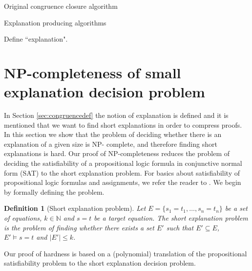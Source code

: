 \documentclass{easychair}
\newtheorem{definition}{Definition}
\begin{document}
Original congruence closure algorithm~\cite{}

Explanation producing algorithms~\cite{}

Define ``explanation".



\section*{NP-completeness of small explanation decision problem}
\label{sec:npcomplete}

In Section \ref{sec:congruencedef} the notion of explanation is
defined and it is mentioned that we want to find short explanations
in order to compress proofs. In this section we show that the problem
of deciding whether there is an explanation of a given size is NP-
complete, and therefore finding short explanations is hard. Our proof
of NP-completeness reduces the problem of deciding the satisfiability
of a propositional logic formula in conjunctive normal form (SAT) to
the short explanation problem. For basics about satisfiability of
propositional logic formulas and assignments, we refer the reader to
\cite{Biere3}. We begin by formally defining the problem.


\begin{definition}[Short explanation problem]
Let $E = \{ s_1 = t_1,\ldots, s_n = t_n\}$ be a set of equations, 
$k \in \mathbb{N}$ and $s = t$ be a target equation.  
The \emph{short explanation problem} is the problem of finding 
whether there exists a set $E'$ such that $E' \subseteq E$, 
$E' \models s = t$ and $|E'| \leq k$.
\end{definition}

\noindent Our proof of hardness is based on a (polynomial) 
translation of the propositional satisfiability problem to 
the short explanation decision problem.

\newcommand{\Assignment}{{\it Assignment}}
\newcommand{\Clause}{{\it Clause}}
\newcommand{\Connect}{{\it Connect}}
\end{document}
